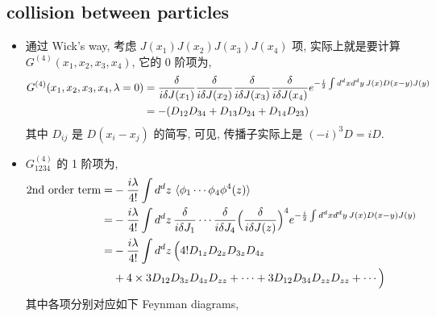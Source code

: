 \subsection{collision between particles}
\begin{itemize}
	\item 通过 Wick's way, 考虑 $J(x_1) J(x_2) J(x_3) J(x_4)$ 项, 实际上就是要计算 $G^{(4)}(x_1, x_2, x_3, x_4)$, 它的 0 阶项为,
	\begin{align}
		G^{(4)}(x_1, x_2, x_3, x_4, \lambda = 0) &= \frac{\delta}{i \delta J(x_1)} \frac{\delta}{i \delta J(x_2)} \frac{\delta}{i \delta J(x_3)} \frac{\delta}{i \delta J(x_4)} e^{- \frac{i}{2} \int d^d x d^d y \, J(x) D(x - y) J(y)} \notag \\
		&= - (D_{1 2} D_{3 4} + D_{1 3} D_{2 4} + D_{1 4} D_{2 3})
	\end{align}
	其中 $D_{i j}$ 是 $D(x_i - x_j)$ 的简写, 可见, 传播子实际上是 $(- i)^3 D = i D$.
	
	\item $G^{(4)}_{1 2 3 4}$ 的 1 阶项为,
	\begin{align}
		\text{2nd order term} =& - \frac{i \lambda}{4!} \int d^d z \, \braket{\phi_1 \cdots \phi_4 \phi^4(z)} \notag \\
		=& - \frac{i \lambda}{4!} \int d^d z \, \frac{\delta}{i \delta J_1} \cdots \frac{\delta}{i \delta J_4} \Big( \frac{\delta}{i \delta J(z)} \Big)^4 e^{- \frac{i}{2} \int d^d x d^d y \, J(x) D(x - y) J(y)} \notag \\
		=& - \frac{i \lambda}{4!} \int d^d z \, \Big( 4! D_{1 z} D_{2 z} D_{3 z} D_{4 z} \notag \\
		& + 4 \times 3 D_{1 2} D_{3 z} D_{4 z} D_{z z} + \cdots + 3 D_{1 2} D_{3 4} D_{z z} D_{z z} + \cdots \Big)
	\end{align}
	其中各项分别对应如下 Feynman diagrams,
	

\end{itemize}
